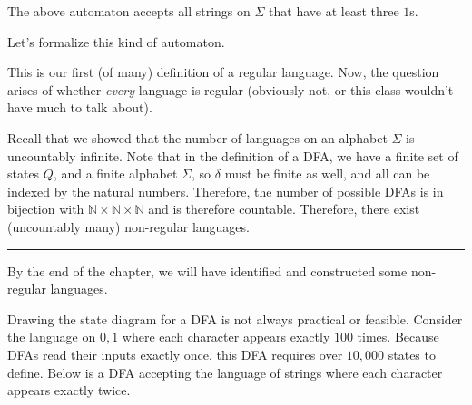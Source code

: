 \documentclass[twoside]{article}
\newenvironment{proof}{{\bf Proof:}}{\hfill\rule{2mm}{2mm}}
\begin{document}
The above automaton accepts all strings on $\Sigma$ that have at least three $1$s.

Let's formalize this kind of automaton.



This is our first (of many) definition of a regular language.  Now, the question arises of whether \textit{every} language is regular (obviously not, or this class wouldn't have much to talk about).


\begin{proof}
	Recall that we showed that the number of languages on an alphabet $\Sigma$ is uncountably infinite.  Note that in the definition of a DFA, we have a finite set of states $Q$, and a finite alphabet $\Sigma$, so $\delta$ must be finite as well, and all can be indexed by the natural numbers.  Therefore, the number of possible DFAs is in bijection with $\mathbb{N}\times\mathbb{N}\times\mathbb{N}$ and is therefore countable.  Therefore, there exist (uncountably many) non-regular languages.
\end{proof}

By the end of the chapter, we will have identified and constructed some non-regular languages.

Drawing the state diagram for a DFA is not always practical or feasible.  Consider the language on ${0,1}$ where each character appears exactly $100$ times.  Because DFAs read their inputs exactly once, this DFA requires over $10,000$ states to define.  Below is a DFA accepting the language of strings where each character appears exactly twice.
\end{document}
